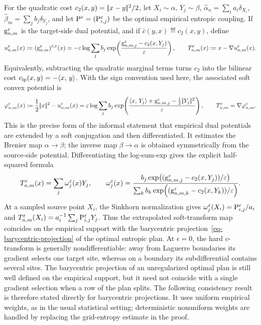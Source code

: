 For the quadratic cost \(c_2(x,y)=\norm{x-y}^2/2\), let \(X_i\sim\alpha\), \(Y_j\sim\beta\), \(\hat\alpha_n=\sum_i a_i\delta_{X_i}\), \(\hat\beta_m=\sum_j b_j\delta_{Y_j}\), and let \(\P^\epsilon=(\P_{i,j}^\epsilon)\) be the optimal empirical entropic coupling. If \(\gD_{n,m}^\epsilon\) is the target-side dual potential, and if \(\bar c(y,x)\eqdef c_2(x,y)\), define
\[
	u_{n,m}^\epsilon(x)
	\eqdef
	(\gD_{n,m}^\epsilon)^{\bar c,\epsilon}(x)
	=
	-\epsilon\log\sum_j b_j
	\exp\!\left(\frac{\gD_{n,m,j}^\epsilon-c_2(x,Y_j)}{\epsilon}\right),
	\qquad
	T_{n,m}^\epsilon(x)\eqdef x-\nabla u_{n,m}^\epsilon(x).
\]
Equivalently, subtracting the quadratic marginal terms turns \(c_2\) into the bilinear cost \(c_{\rm ip}(x,y)=-\dotp{x}{y}\). With the sign convention used here, the associated soft convex potential is
\[
	\varphi_{n,m}^\epsilon(x)
	\eqdef
	\frac12\norm{x}^2-u_{n,m}^\epsilon(x)
	=
	\epsilon\log\sum_j b_j
	\exp\!\left(
		\frac{\dotp{x}{Y_j}+\gD_{n,m,j}^\epsilon-\frac12\norm{Y_j}^2}{\epsilon}
	\right),
	\qquad
	T_{n,m}^\epsilon=\nabla\varphi_{n,m}^\epsilon.
\]
This is the precise form of the informal statement that empirical dual potentials are extended by a soft conjugation and then differentiated. It estimates the Brenier map \(\alpha\to\beta\); the inverse map \(\beta\to\alpha\) is obtained symmetrically from the source-side potential. Differentiating the log-sum-exp gives the explicit half-squared formula
\begin{equation}\label{eq-empirical-entropic-map-barycentric}
	T_{n,m}^\epsilon(x)
	=
	\sum_j \omega_j^\epsilon(x)Y_j,
	\qquad
	\omega_j^\epsilon(x)
	=
	\frac{
		b_j\exp\!\left((\gD_{n,m,j}^\epsilon-c_2(x,Y_j))/\epsilon\right)
	}{
		\sum_k b_k\exp\!\left((\gD_{n,m,k}^\epsilon-c_2(x,Y_k))/\epsilon\right)
	}.
\end{equation}
At a sampled source point \(X_i\), the Sinkhorn normalization gives \(\omega_j^\epsilon(X_i)=\P_{i,j}^\epsilon/a_i\) and \(T_{n,m}^\epsilon(X_i)=a_i^{-1}\sum_j \P_{i,j}^\epsilon Y_j\).
Thus the extrapolated soft-transform map coincides on the empirical support with the barycentric projection~\eqref{eq-barycentric-projection} of the optimal entropic plan. At \(\epsilon=0\), the hard \(c\)-transform is generally nondifferentiable: away from Laguerre boundaries its gradient selects one target site, whereas on a boundary its subdifferential contains several sites. The barycentric projection of an unregularized optimal plan is still well defined on the empirical support, but it need not coincide with a single gradient selection when a row of the plan splits. The following consistency result is therefore stated directly for barycentric projections. It uses uniform empirical weights, as in the usual statistical setting; deterministic nonuniform weights are handled by replacing the grid-entropy estimate in the proof.

